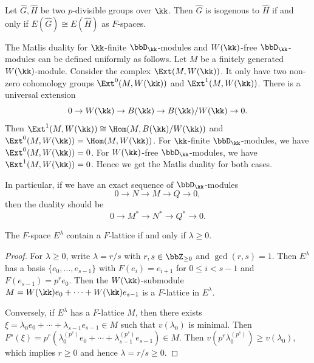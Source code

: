 \begin{proposition}
	Let $\hat{G}, \hat{H}$ be two $p$-divisible groups over $\kk$.
	Then $\hat{G}$ is isogenous to $\hat{H}$ if and only if $E(\hat{G}) \cong E(\hat{H})$ as $F$-spaces.
\end{proposition}

\begin{remark}
	The Matlis duality for $\kk$-finite $\bbD_\kk$-modules and $W(\kk)$-free $\bbD_\kk$-modules can be defined uniformly as follows.
	Let $M$ be a finitely generated $W(\kk)$-module.
	Consider the complex $\Ext(M, W(\kk))$.
	It only have two non-zero cohomology groups $\Ext^0(M, W(\kk))$ and $\Ext^1(M, W(\kk))$.
	There is a universal extension
	\[ 0 \to W(\kk) \to B(\kk) \to B(\kk)/W(\kk) \to 0. \]
	Then $\Ext^1(M, W(\kk)) \cong \Hom(M, B(\kk)/W(\kk))$ and $\Ext^0(M, W(\kk)) = \Hom(M, W(\kk))$.
	For $\kk$-finite $\bbD_\kk$-modules, we have $\Ext^0(M, W(\kk)) = 0$.
	For $W(\kk)$-free $\bbD_\kk$-modules, we have $\Ext^1(M, W(\kk)) = 0$.
	Hence we get the Matlis duality for both cases.

	In particular, if we have an exact sequence of $\bbD_\kk$-modules
	\[ 0 \to N \to M \to Q \to 0, \]
	then the duality should be
	\[ 0 \to M^* \to N^* \to Q^* \to 0. \]
\end{remark}

%

\begin{proposition}
	The $F$-space $E^\lambda$ contain a $F$-lattice if and only if $\lambda \ge 0$.
\end{proposition}
\begin{proof}[Proof]
	For $\lambda \geq 0$, write $\lambda = r/s$ with $r, s \in \bbZ_{\geq 0}$ and $\gcd(r, s) = 1$.
	Then $E^\lambda$ has a basis $\{e_0, \ldots, e_{s-1}\}$ with $F(e_i) = e_{i+1}$ for $0 \leq i < s-1$ and $F(e_{s-1}) = p^r e_0$.
	Then the $W(\kk)$-submodule $M = W(\kk) e_0 + \cdots + W(\kk) e_{s-1}$ is a $F$-lattice in $E^\lambda$.

	Conversely, if $E^\lambda$ has a $F$-lattice $M$, then there exists $\xi = \lambda_0 e_0 + \cdots + \lambda_{s-1} e_{s-1} \in M$ such that $v(\lambda_0)$ is minimal.
	Then $F^s(\xi) = p^r \left( \lambda_0^{(p^s)} e_0 + \cdots + \lambda_{s-1}^{(p^s)} e_{s-1} \right) \in M$.
	Then $v(p^r \lambda_0^{(p^s)}) \geq v(\lambda_0)$, which implies $r \geq 0$ and hence $\lambda = r/s \geq 0$.
\end{proof}

